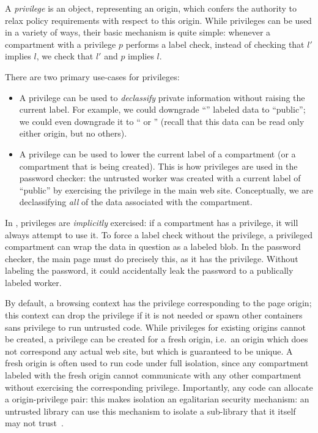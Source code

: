 A \emph{privilege} is an object, representing an origin, which confers
the authority to relax policy requirements with respect to this origin.
%
While privileges can be used in a variety of ways, their basic mechanism
is quite simple:  whenever a compartment with a privilege $p$ performs a
label check, instead of checking that $l'$ implies $l$, we check that
$l'$ and $p$ implies $l$.

There are two primary use-cases for privileges:

\begin{itemize}
    \item A privilege can be used to \emph{declassify} private
        information without raising the current label.  For example, we
        could downgrade ``'' labeled data to
        ``public''; we could even downgrade it to ``
        or '' (recall that this data can be read only
        either origin, but no others).

    \item A privilege can be used to lower the current label of
        a compartment (or a compartment that is being created).
        This is how privileges are used
        in the password checker: the untrusted worker was created
        with a current label of ``public'' by exercising the
         privilege in the main web site.  Conceptually, we
        are declassifying \emph{all} of the data associated with the
        compartment.
\end{itemize}

In \sys{}, privileges are \emph{implicitly} exercised: if a compartment
has a privilege, it will always attempt to use it.  To force a label
check without the privilege, a privileged compartment can wrap the
data in question as a labeled blob.  In the password checker, the main
page must do precisely this, as it has the  privilege.
Without labeling the password, it could accidentally leak the password
to a publically labeled worker.

By default, a browsing context has the privilege corresponding to the
page origin; this context can drop the privilege if it is not
needed or spawn other containers sans privilege to run untrusted code.
%
While privileges for existing origins cannot be created, a privilege can
be created for a fresh origin, i.e.\ an origin which does not correspond
any actual web site, but which is guaranteed to be unique.
%
A fresh origin is often used to run code under full isolation, since any
compartment labeled with the fresh origin cannot communicate with any
other compartment without exercising the corresponding privilege.
%
Importantly, any code can allocate a origin-privilege pair: this
makes isolation an egalitarian security mechanism: an untrusted library
can use this mechanism to isolate a sub-library that it itself
may not trust~\cite{Zeldovich:2006}.

